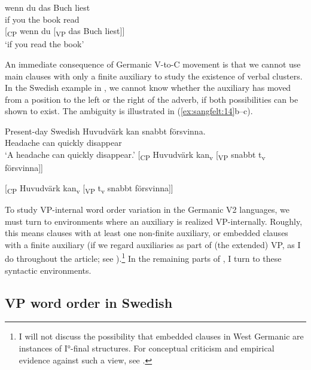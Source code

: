 \documentclass[output=paper, colorlinks, citecolor=brown]{langscibook}
\begin{document}
\ex\label{ex:sangfelt:13b}
\gll wenn du das Buch liest \\
 if you the book read\\

[\textsubscript{CP} wenn du [\textsubscript{VP} {das} {Buch} liest]]\\

\glt ‘if you read the book’
\z 
\z 

An immediate consequence of Germanic V-to-C movement is that we cannot use main clauses with only a finite auxiliary to study the existence of verbal clusters. In the Swedish example in , we cannot know whether the auxiliary has moved from a position to the left or the right of the adverb, if both possibilities can be shown to exist. The ambiguity is illustrated in (\ref{ex:sangfelt:14}b–c).

\ea Present-day Swedish\label{ex:sangfelt:14}
\ea \label{ex:sangfelt:14a}
\gll Huvudvärk kan {snabbt} försvinna.  \\
 Headache can quickly disappear \\
\glt ‘A headache can quickly disappear.’
\ex\label{ex:sangfelt:14b}
[\textsubscript{CP} Huvudvärk kan\textsubscript{v} [\textsubscript{VP} snabbt t\textsubscript{v} försvinna]]

[\textsubscript{CP} Huvudvärk kan\textsubscript{v} [\textsubscript{VP} t\textsubscript{v} snabbt försvinna]]
\z 
\z

To study VP-internal word order variation in the Germanic V2 languages, we must turn to environments where an auxiliary is realized VP-internally. Roughly, this means clauses with at least one non-finite auxiliary, or embedded clauses with a finite auxiliary (if we regard auxiliaries as part of (the extended) VP, as I do throughout the article; see ).\footnote{I will not discuss the possibility that embedded clauses in West Germanic are instances of I°-final structures. For conceptual criticism and empirical evidence against such a view, see \citet[54–68]{Haider2010}.} In the remaining parts of , I turn to these syntactic environments.

\subsection{VP word order in Swedish}\label{sec:sangfelt:3.2}
\end{document}

